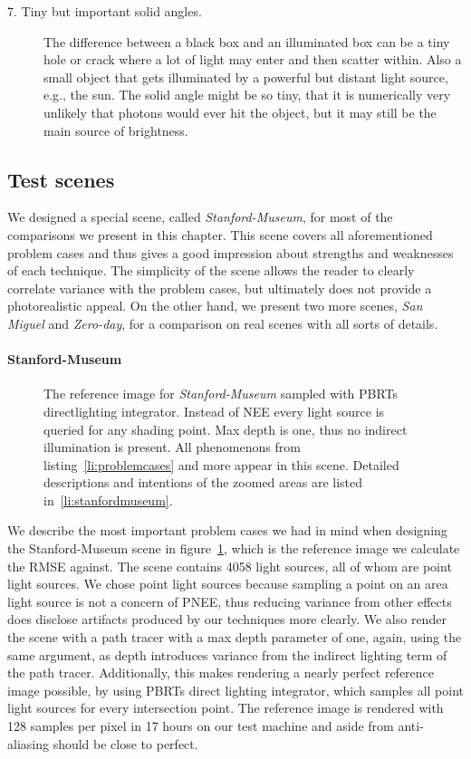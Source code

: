 \begin{description}
    \item[7. Tiny but important solid angles.] The difference between a black box and an illuminated box can be a tiny hole or crack where a lot of light may enter and then scatter within. Also a small object that gets illuminated by a powerful but distant light source, e.g., the sun. The solid angle might be so tiny, that it is numerically very unlikely that photons would ever hit the object, but it may still be the main source of brightness.
\label{li:problemcases}
\end{description} 

\subsection{Test scenes}

We designed a special scene, called \textit{Stanford-Museum}, for most of the comparisons we present in this chapter. This scene covers all aforementioned problem cases and thus gives a good impression about strengths and weaknesses of each technique. The simplicity of the scene allows the reader to clearly correlate variance with the problem cases, but ultimately does not provide a photorealistic appeal. On the other hand, we present two more scenes, \textit{San Miguel} and \textit{Zero-day}, for a comparison on real scenes with all sorts of details.

\paragraph{Stanford-Museum}
\label{sec:stanfordmuseum}
\begin{figure}[ht]\centering

\caption{The reference image for \textit{Stanford-Museum} sampled with PBRTs directlighting integrator. Instead of NEE every light source is queried for any shading point. Max depth is one, thus no indirect illumination is present. All phenomenons from listing~\ref{li:problemcases} and more appear in this scene. Detailed descriptions and intentions of the zoomed areas are listed in~\ref{li:stanfordmuseum}.
}
\label{fig:stanfordmuseumref}
\end{figure}

We describe the most important problem cases we had in mind when designing the Stanford-Museum scene in figure~\ref{fig:stanfordmuseumref}, which is the reference image we calculate the RMSE against. The scene contains 4058 light sources, all of whom are point light sources. We chose point light sources because sampling a point on an area light source is not a concern of PNEE, thus reducing variance from other effects does disclose artifacts produced by our techniques more clearly. We also render the scene with a path tracer with a max depth parameter of one, again, using the same argument, as depth introduces variance from the indirect lighting term of the path tracer. Additionally, this makes rendering a nearly perfect reference image possible, by using PBRTs direct lighting integrator, which samples all point light sources for every intersection point. The reference image is rendered with 128 samples per pixel in 17 hours on our test machine and aside from anti-aliasing should be close to perfect. 

